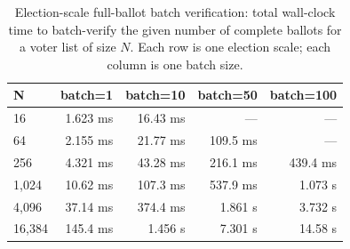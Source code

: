 \begin{table}[h]
  \centering
  \caption{Election-scale full-ballot batch verification: total wall-clock time to batch-verify the given number of complete ballots for a voter list of size $N$. Each row is one election scale; each column is one batch size.}
  \label{tab:g3b_election_batch_verify}
  \begin{tabular}{lrrrr}
    \toprule
    N & batch=1 & batch=10 & batch=50 & batch=100 \\
    \midrule
16 & 1.623 ms & 16.43 ms & — & — \\
64 & 2.155 ms & 21.77 ms & 109.5 ms & — \\
256 & 4.321 ms & 43.28 ms & 216.1 ms & 439.4 ms \\
1,024 & 10.62 ms & 107.3 ms & 537.9 ms & 1.073 s \\
4,096 & 37.14 ms & 374.4 ms & 1.861 s & 3.732 s \\
16,384 & 145.4 ms & 1.456 s & 7.301 s & 14.58 s \\
    \bottomrule
  \end{tabular}
\end{table}
